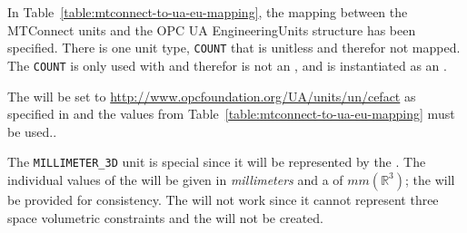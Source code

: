 In Table~\ref{table:mtconnect-to-ua-eu-mapping}, the mapping between the MTConnect units and the OPC UA EngineeringUnits structure has been specified. There is one unit type, \texttt{COUNT} that is unitless and therefor not mapped. The \texttt{COUNT} is only used with  and therefor is not an , and is instantiated as an .

The  will be set to \url{http://www.opcfoundation.org/UA/units/un/cefact} as specified in \cite{UAPart8} and the values from Table~\ref{table:mtconnect-to-ua-eu-mapping} must be used..

The \texttt{MILLIMETER_3D} unit is special since it will be represented by the . The individual values of the   will be given in \textit{millimeters} and a  of $mm(\mathbb{R}^{3})$; the  will be provided for consistency. The  will not work since it cannot represent three space volumetric constraints and the  will not be created.

